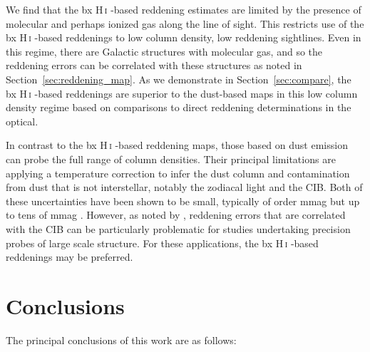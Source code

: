 \documentclass[iop,apj]{emulateapj}
\makeatletter
\def\testbx{bx}%
\DeclareRobustCommand{\ion}[2]{%
\relax\ifmmode
\ifx\testbx\f@series
{\mathbf{#1\,\mathsc{#2}}}\else
{\mathrm{#1\,\mathsc{#2}}}\fi
\else\textup{#1\,{\mdseries\textsc{#2}}}%
\fi}
\makeatother
\begin{document}
We find that the \ion{H}{i}-based reddening estimates are limited by the presence of molecular and perhaps ionized gas along the line of sight. This restricts use of the \ion{H}{i}-based reddenings to low column density, low reddening sightlines. Even in this regime, there are Galactic structures with molecular gas, and so the reddening errors can be correlated with these structures as noted in Section~\ref{sec:reddening_map}. As we demonstrate in Section~\ref{sec:compare}, the \ion{H}{i}-based reddenings are superior to the dust-based maps in this low column density regime based on comparisons to direct reddening determinations in the optical.

In contrast to the \ion{H}{i}-based reddening maps, those based on dust emission can probe the full range of column densities. Their principal limitations are applying a temperature correction to infer the dust column and contamination from dust that is not interstellar, notably the zodiacal light and the CIB. Both of these uncertainties have been shown to be small, typically of order mmag but up to tens of mmag \citep{Peek+Graves_2010}. However, as noted by \citet{Yahata+etal_2007}, reddening errors that are correlated with the CIB can be particularly problematic for studies undertaking precision probes of large scale structure. For these applications, the \ion{H}{i}-based reddenings may be preferred.

\section{Conclusions}
\label{sec:conclusions}

The principal conclusions of this work are as follows:
\end{document}
